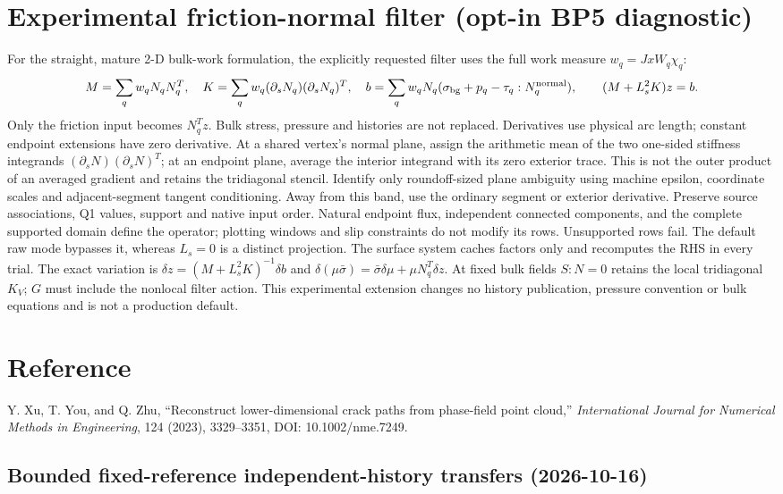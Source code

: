 \documentclass[11pt]{article}
\begin{document}
\section*{Experimental friction-normal filter (opt-in BP5 diagnostic)}
For the straight, mature 2-D bulk-work formulation, the explicitly requested
filter uses the full work measure $w_q=JxW_q\chi_q$:
\[
 M=\sum_qw_q N_qN_q^T,\quad
 K=\sum_qw_q(\partial_sN_q)(\partial_sN_q)^T,\quad
 b=\sum_qw_qN_q(\sigma_{\rm bg}+p_q-\tau_q:N_q^{\rm normal}),
 \qquad (M+L_s^2K)z=b.
\]
Only the friction input becomes $N_q^Tz$. Bulk stress, pressure and histories
are not replaced. Derivatives use physical arc length; constant endpoint
extensions have zero derivative. At a shared vertex's normal plane, assign
the arithmetic mean of the two one-sided stiffness integrands
$(\partial_sN)(\partial_sN)^T$; at an endpoint plane, average the interior
integrand with its zero exterior trace. This is not the outer product of an
averaged gradient and retains the tridiagonal stencil. Identify only
roundoff-sized plane ambiguity using machine epsilon, coordinate scales and
adjacent-segment tangent conditioning. Away from this band, use the ordinary
segment or exterior derivative. Preserve source associations, Q1 values,
support and native input order. Natural endpoint flux, independent connected
components, and the complete supported domain define the operator; plotting
windows and slip constraints do not modify its rows. Unsupported rows fail.
The default raw mode bypasses it, whereas $L_s=0$ is a distinct projection.
The surface system caches factors only and recomputes the RHS in every trial.
The exact variation is $\delta z=(M+L_s^2K)^{-1}\delta b$ and
$\delta(\mu\bar\sigma)=\bar\sigma\delta\mu+\mu N_q^T\delta z$.
At fixed bulk fields $S:N=0$ retains the local tridiagonal $K_V$; $G$ must
include the nonlocal filter action. This experimental extension changes no
history publication, pressure convention or bulk equations and is not a
production default.

\section*{Reference}
Y. Xu, T. You, and Q. Zhu, ``Reconstruct lower-dimensional crack paths from phase-field point cloud,'' \emph{International Journal for Numerical Methods in Engineering}, 124 (2023), 3329--3351, DOI: 10.1002/nme.7249.

\subsection{Bounded fixed-reference independent-history transfers (2026-10-16)}
\end{document}
